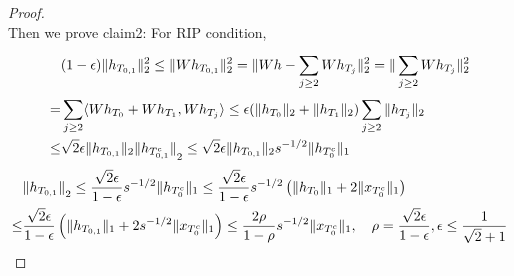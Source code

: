 \begin{theorem}
\begin{proof}
\[        \]
        Then we prove claim2:
        For RIP condition,
        \begin{align*}
            &(1-\epsilon) \Arrowvert h_{T_{0,1}} \Arrowvert^2_2 \le \Arrowvert W h_{T_{0,1}} \Arrowvert^2_2
            = \Arrowvert Wh - \sum^{}_{j \ge 2} W h_{T_j} \Arrowvert^2_2 = \Arrowvert \sum^{}_{j \ge 2} W h_{T_j} \Arrowvert^2_2 \\
            =& \sum^{}_{j \ge 2} \langle W h_{T_0} + W h_{T_1}, W h_{T_j} \rangle \le \epsilon ( \Arrowvert h_{T_0} \Arrowvert_2 + \Arrowvert h_{T_1} \Arrowvert_2)\sum^{}_{j \ge 2} \Arrowvert h_{T_j} \Arrowvert_2 \\
            \le& \sqrt{2} \epsilon \Arrowvert h_{T_{0,1}} \Arrowvert_2 {\Arrowvert h_{T^c_{0,1}} \Arrowvert}_2
            \le \sqrt{2} \epsilon \Arrowvert h_{T_{0,1}} \Arrowvert_2 s^{-1/2} \Arrowvert h_{T^c_0} \Arrowvert_1
        \end{align*}
        \begin{align*}
            &{\Arrowvert h_{T_{0,1}} \Arrowvert}_2 
            \le \frac{\sqrt 2 \epsilon}{1- \epsilon} s^{-1/2} \Arrowvert h_{T^c_{0}} \Arrowvert_1 
            \le \frac{\sqrt 2 \epsilon}{1- \epsilon} s^{-1/2} \left( \Arrowvert h_{T_0} \Arrowvert_1 + 2 \Arrowvert x_{T^c_0} \Arrowvert_1 \right)\\
            \le& \frac{\sqrt 2 \epsilon}{1- \epsilon} \left( \Arrowvert h_{T_{0,1}} \Arrowvert_1 + 2 s^{-1/2} \Arrowvert x_{T^c_{0}} \Arrowvert_1 \right) 
            \le \frac{2 \rho}{1 - \rho}  s^{-1/2} \Arrowvert x_{T^c_0} \Arrowvert_1, \quad \rho = \frac{\sqrt 2 \epsilon}{1 - \epsilon}, \epsilon \le \frac{1}{\sqrt 2 + 1}  
        \end{align*}
    \end{proof}
\end{theorem}

